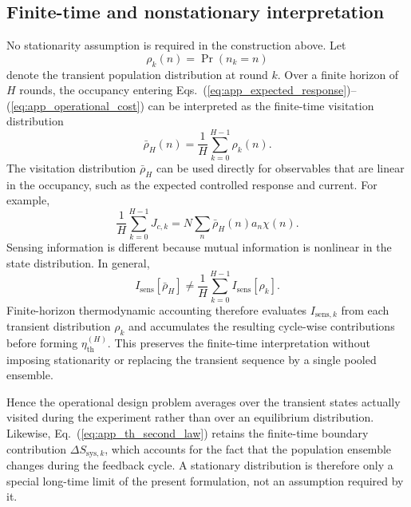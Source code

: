 \subsection{Finite-time and nonstationary interpretation}
\label{app:nonstationary_design}

No stationarity assumption is required in the construction above. Let
\begin{equation}
\rho_k(n)=\Pr(n_k=n)
\end{equation}
denote the transient population distribution at round \(k\). Over a finite horizon of \(H\) rounds, the occupancy entering Eqs.~(\ref{eq:app_expected_response})--(\ref{eq:app_operational_cost}) can be interpreted as the finite-time visitation distribution
\begin{equation}
\bar{\rho}_H(n)
=
\frac{1}{H}
\sum_{k=0}^{H-1}\rho_k(n).
\label{eq:app_finite_time_occupancy}
\end{equation}
The visitation distribution $\bar{\rho}_H$ can be used directly for observables
that are linear in the occupancy, such as the expected controlled response and
current. For example,
\begin{equation}
\frac{1}{H}\sum_{k=0}^{H-1}J_{c,k}
=N\sum_n\bar{\rho}_H(n)a_n\chi(n).
\label{eq:app_occupancy_average_current}
\end{equation}
Sensing information is different because mutual information is nonlinear in
the state distribution. In general,
\begin{equation}
I_{\mathrm{sens}}[\bar{\rho}_H]
\ne
\frac{1}{H}\sum_{k=0}^{H-1}I_{\mathrm{sens}}[\rho_k].
\label{eq:app_nonpooled_sensing_information}
\end{equation}
Finite-horizon thermodynamic accounting therefore evaluates
$I_{\mathrm{sens},k}$ from each transient distribution $\rho_k$ and accumulates
the resulting cycle-wise contributions before forming
$\eta_{\mathrm{th}}^{(H)}$. This preserves the finite-time interpretation
without imposing stationarity or replacing the transient sequence by a single
pooled ensemble.

Hence the operational design problem averages over the transient states actually visited during the experiment rather than over an equilibrium distribution. Likewise, Eq.~(\ref{eq:app_th_second_law}) retains the finite-time boundary contribution \(\Delta S_{\mathrm{sys},k}\), which accounts for the fact that the population ensemble changes during the feedback cycle. A stationary distribution is therefore only a special long-time limit of the present formulation, not an assumption required by it.
